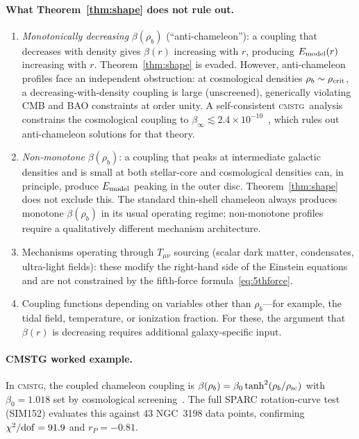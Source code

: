 \documentclass[12pt,a4paper]{article}
\theoremstyle{plain}
\newcommand{\rsc}{\rho_{\rm sc}}
\newcommand{\rhob}{\rho_b}
\newcommand{\CMSTG}{\textsc{cmstg}}
\begin{document}
\paragraph{What Theorem~\ref{thm:shape} does not rule out.}
\begin{enumerate}
  \item \emph{Monotonically decreasing} $\beta(\rhob)$ (``anti-chameleon''):
        a coupling that decreases with density gives $\beta(r)$ increasing
        with $r$, producing $E_{\rm model}(r)$ increasing with $r$.
        Theorem~\ref{thm:shape} is evaded.  However, anti-chameleon profiles
        face an independent obstruction: at cosmological densities $\rhob \sim
        \rho_{\rm crit}$, a decreasing-with-density coupling is large
        (unscreened), generically violating CMB and BAO constraints at order
        unity.  A self-consistent \CMSTG\ analysis constrains the cosmological
        coupling to $\beta_\infty \lesssim 2.4\times10^{-10}$~\cite{WilsonPaperIV},
        which rules out anti-chameleon solutions for that theory.
  \item \emph{Non-monotone} $\beta(\rhob)$: a coupling that peaks at
        intermediate galactic densities and is small at both stellar-core
        and cosmological densities can, in principle, produce $E_{\rm model}$
        peaking in the outer disc.  Theorem~\ref{thm:shape} does not exclude
        this.  The standard thin-shell chameleon always produces monotone
        $\beta(\rhob)$ in its usual operating regime; non-monotone profiles
        require a qualitatively different mechanism architecture.
  \item Mechanisms operating through $T_{\mu\nu}$ sourcing (scalar dark
        matter, condensates, ultra-light fields): these modify the right-hand
        side of the Einstein equations and are not constrained by the
        fifth-force formula~\eqref{eq:5thforce}.
  \item Coupling functions depending on variables other than $\rhob$---for
        example, the tidal field, temperature, or ionization fraction.  For
        these, the argument that $\beta(r)$ is decreasing requires additional
        galaxy-specific input.
\end{enumerate}

\paragraph{CMSTG worked example.}
In \CMSTG, the coupled chameleon coupling is
$\beta(\rhob) = \beta_0\tanh^2(\rhob/\rsc)$ with $\beta_0 = 1.018$ set by
cosmological screening~\cite{WilsonPaperIV}.  The full SPARC rotation-curve
test (SIM152) evaluates this against 43 NGC~3198 data points, confirming
$\chi^2/{\rm dof} = 91.9$ and $r_P = -0.81$.
\end{document}
